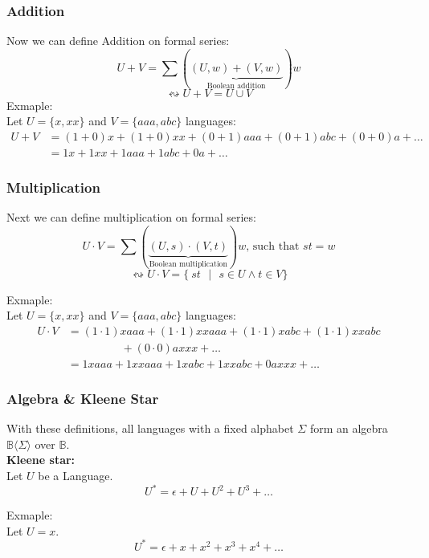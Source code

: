 \documentclass{beamer}
\begin{document}
\begin{frame}
  \frametitle{Addition}
    Now we can define Addition on formal series:
  \[ U + V = \sum (\underbrace{(U,w) + (V,w)}_\text{Boolean addition})w\]
  \[\leftrightsquigarrow  U + V = U \cup V\] 
  Exmaple:\\
  Let $U = \{x, xx\}$ and $V = \{aaa, abc\}$ languages:
  \begin{align*} 
    U + V &= (1+0)x + (1+0)xx + (0+1)aaa + (0+1)abc  + (0+0)a + \dots \\
          &= 1x + 1xx + 1aaa + 1abc + 0a + \dots
  \end{align*}
\end{frame}

\begin{frame}
  \frametitle{Multiplication}
  Next we can define multiplication on formal series:
    \[
      U \cdot V = \sum (\underbrace{(U,s) \cdot (V,t)}_\text{Boolean multiplication})w
      \text{, such that  } st = w
    \]
    \[\leftrightsquigarrow U \cdot V = \{\ st \text{ } | \text{ } s \in U \land t \in V \} \]

  Exmaple:\\
  Let $U = \{x, xx\}$ and $V = \{aaa, abc\}$ languages:
  \begin{align*} 
    U \cdot V &= (1\cdot1)xaaa + (1\cdot1)xxaaa + (1\cdot1)xabc 
    + (1\cdot1)xxabc  \\ &\hspace{2cm} + (0\cdot0)axxx + \dots \\
              &= 1xaaa + 1xxaaa + 1xabc + 1xxabc  + 0axxx + \dots 
  \end{align*}
\end{frame}

\begin{frame}
  \frametitle{Algebra \& Kleene Star}
  With these definitions, all languages with a fixed alphabet $\Sigma$
  form an algebra $\mathbb{B}\langle \Sigma \rangle $ over $\mathbb{B}$.\\
  \vspace*{1cm}
  {\bf Kleene star:} \\
  Let $U$ be a Language.\\
  \[ U^* = \epsilon + U + U^2 + U^3 + \dots \]

  Exmaple:\\
  Let $U = x$.
  \[ U^* = \epsilon + x  + x^2 + x^3 + x^4 + \dots \]

  
\end{frame}
\end{document}
